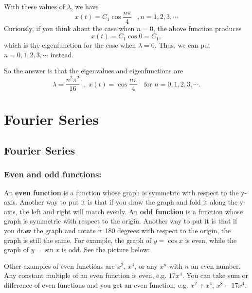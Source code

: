 \documentclass[12pt]{report}
\begin{document}
With these values of $\lambda$, we have
$$ x(t) = C_1 \cos \frac{n\pi}{4} \; \; \; , n= 1,2,3, \cdots$$
Curiously, if you think about the case when $n=0$, the above function produces 
$$x(t) = C_1 \cos 0 = C_1,$$
 which is the eigenfunction for the case when $\lambda=0$. Thus, we can put $n= 0,1,2,3, \cdots $ instead.


So the answer is that the eigenvalues and eigenfunctions are 
$$\lambda = \frac{n^2\pi^2}{16} \; \; , \; x(t)=\cos \frac{n\pi}{4} \; \; \textrm{ for }  n= 0,1,2,3, \cdots.$$ 



\chapter{Fourier Series}

\section{Fourier Series}

\subsection*{Even and odd functions:}
An \textbf{even function} is a function whose graph is symmetric with respect to the y-axis. Another way to put it is that if you draw the graph and fold it along the y-axis, the left and right will match evenly.
An \textbf{odd function} is a function whose graph is symmetric with respect to the origin. Another way to put it is that if you draw the graph and rotate it 180 degrees with respect to the origin, the graph is still the same.
For example, the graph of $y= \cos x$ is even, while the graph of $y=\sin x $ is odd. See the picture below:
\begin{center}  \end{center}

Other examples of even functions are $x^2$, $x^4$,  or any $x^n$ with $n$ an even number. Any constant multiple of an even function is even, e.g. $17x^4$.  You can take sum or difference of even functions and you get an even function, e.g. $x^2+x^4$, $x^8 - 17x^4 $.
\end{document}
